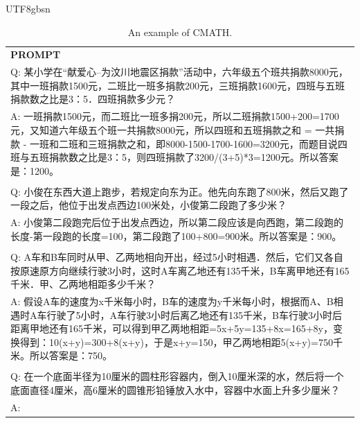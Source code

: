 \documentclass[11pt, a4paper, logo, copyright, nonumbering]{deepseek}
\begin{document}
\begin{CJK*}{UTF8}{gbsn}
\begin{table}[ht]
    \centering \small
\begin{tabular}{p{12cm}}
\toprule
\textbf{PROMPT}\\
Q: 某小学在“献爱心--为汶川地震区捐款”活动中，六年级五个班共捐款8000元，其中一班捐款1500元，二班比一班多捐款200元，三班捐款1600元，四班与五班捐款数之比是3：5．四班捐款多少元？
\\A: 一班捐款1500元，而二班比一班多捐200元，所以二班捐款1500+200=1700元，又知道六年级五个班一共捐款8000元，所以四班和五班捐款之和 = 一共捐款 - 一班和二班和三班捐款之和，即8000-1500-1700-1600=3200元，而题目说四班与五班捐款数之比是3：5，则四班捐款了3200/(3+5)*3=1200元。所以答案是：1200。
\\
\\Q: 小俊在东西大道上跑步，若规定向东为正。他先向东跑了800米，然后又跑了一段之后，他位于出发点西边100米处，小俊第二段跑了多少米？
\\A: 小俊第二段跑完后位于出发点西边，所以第二段应该是向西跑，第二段跑的长度-第一段跑的长度=100，第二段跑了100+800=900米。所以答案是：900。
\\
\\Q: A车和B车同时从甲、乙两地相向开出，经过5小时相遇．然后，它们又各自按原速原方向继续行驶3小时，这时A车离乙地还有135千米，B车离甲地还有165千米．甲、乙两地相距多少千米？
\\A: 假设A车的速度为x千米每小时，B车的速度为y千米每小时，根据而A、B相遇时A车行驶了5小时，A车行驶3小时后离乙地还有135千米，B车行驶3小时后距离甲地还有165千米，可以得到甲乙两地相距=5x+5y=135+8x=165+8y，变换得到：10(x+y)=300+8(x+y)，于是x+y=150，甲乙两地相距5(x+y)=750千米。所以答案是：750。
\\
\\Q: 在一个底面半径为10厘米的圆柱形容器内，倒入10厘米深的水，然后将一个底面直径4厘米，高6厘米的圆锥形铅锤放入水中，容器中水面上升多少厘米？
\\A:\\
\bottomrule
\end{tabular}
    \caption{\centering An example of CMATH.}
    \label{tab:cmath_eval_format_example}
\end{table}


\end{CJK*}
\end{document}
